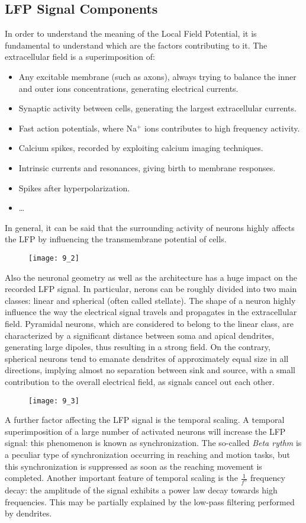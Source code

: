 \subsection{LFP Signal Components}
In order to understand the meaning of the Local Field Potential, it is fundamental to
understand which are the factors contributing to it. The extracellular field is
a superimposition of:
\begin{itemize}
    \item Any excitable membrane (such as axons), always trying to balance the inner
    and outer ions concentrations, generating electrical currents.
    \item Synaptic activity between cells, generating the largest extracellular
    currents.
    \item Fast action potentials, where Na\({}^+\) ions contributes to high frequency
    activity.
    \item Calcium spikes, recorded by exploiting calcium imaging techniques.
    \item Intrinsic currents and resonances, giving birth to membrane responses.
    \item Spikes after hyperpolarization.
    \item \dots
\end{itemize}
In general, it can be said that the surrounding activity of neurons highly affects the
LFP by influencing the transmembrane potential of cells.
\begin{figure}[H]
    \texttt{[image: 9\_2]}
    \centering
\end{figure}
Also the neuronal geometry as well as the architecture has a huge impact on the
recorded LFP signal. In particular, nerons can be roughly divided into two main
classes: linear and spherical (often called stellate). The shape of a neuron highly
influence the way the electrical signal travels and propagates in the extracellular
field. Pyramidal neurons, which are considered to belong to the linear class, are
characterized by a significant distance between soma and apical dendrites, generating
large dipoles, thus resulting in a strong field. On the contrary, spherical neurons
tend to emanate dendrites of approximately equal size in all directions, implying
almost no separation between sink and source, with a small contribution to the overall
electrical field, as signals cancel out each other.
\begin{figure}[H]
    \texttt{[image: 9\_3]}
    \centering
\end{figure}
A further factor affecting the LFP signal is the temporal scaling. A temporal
superimposition of a large number of activated neurons will increase the LFP
signal: this phenomenon is known as synchronization. The so-called \textit{Beta rythm}
is a peculiar type of synchronization occurring in reaching and motion tasks, but this
synchronization is suppressed as soon as the reaching movement is completed. Another
important feature of temporal scaling is the \(\frac{1}{f^{\alpha}}\) frequency decay:
the amplitude of the signal exhibits a power law decay towards high frequencies. This
may be partially explained by the low-pass filtering performed by dendrites.